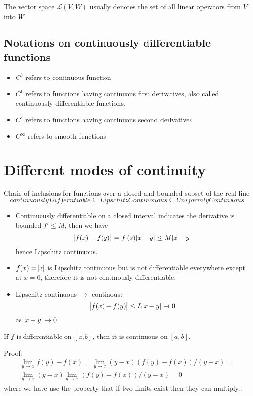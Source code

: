 \begin{refsection}
The vector space $\mathcal{L}(V,W)$ usually denotes the set of all linear operators from $V$ into $W$.

\subsection{Notations on continuously differentiable functions}
\begin{itemize}
    \item $C^0$ refers to continuous function
    \item $C^1$ refers to functions having continuous first derivatives, also called continuously differentiable functions.
    \item $C^2$ refers to functions having continuous second derivatives
    \item $C^\infty$ refers to smooth functions
\end{itemize}

\section{Different modes of continuity}
Chain of inclusions for functions over a closed and bounded subset of the real line
$$continuouslyDifferntiable \subseteq LipschitzContinouous\subseteq UniformlyContinuous $$

\begin{remark}\hfill
\begin{itemize}
    \item Continuously differentiable on a closed interval indicates the derivative is bounded $f' \leq M$, then we have
    $$\abs{f(x)-f(y)} = f'(s)\abs{x-y} \leq M \abs{x-y}$$
    hence Lipschitz continuous.
    \item $f(x)=\abs{x}$ is Lipschitz continuous but is not  differentiable everywhere except at $x=0$, therefore it is not continously differentiable.
    \item Lipschitz continuous $\to$ continous: 
    $$\abs{f(x)-f(y)} \leq L\abs{x-y} \to 0$$ as $\abs{x-y} \to 0$
\end{itemize}
\end{remark}


\begin{lemma}
If $f$ is differentiable on $[a,b]$, then it is continuous on $[a,b]$.
\end{lemma}
Proof: 
\begin{align*}
   \lim_{y\to x} f(y)-f(x) = \lim_{y\to x} (y-x)(f(y)-f(x))/(y-x)= \\
   \lim_{y\to x} (y-x)\lim_{y\to x}(f(y)-f(x))/(y-x) = 0 
\end{align*}
where we have use the property that if two limits exist then they can multiply.\cite[42]{johnsonbaugh2010foundations}.


\end{refsection}
